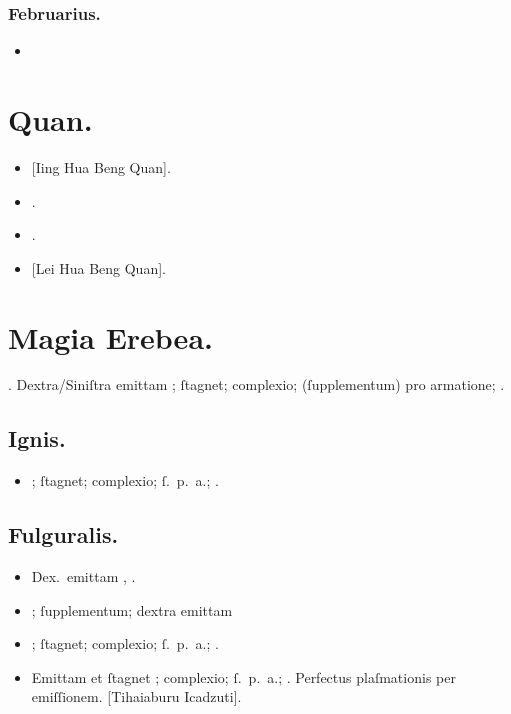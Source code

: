 \documentclass[12pt]{book}
\begin{document}
\subsection{Februarius.}\label{februarius}

\begin{itemize}
  \item {}
\end{itemize}


\chapter{Quan.}\label{quan}

\begin{itemize}
  \item {} [Iing Hua Beng Quan].
  \item {} .
  \item {} .
  \item {} [Lei Hua Beng Quan].
\end{itemize}

\chapter{Magia Erebea.}\label{magia-erebea}
.
\noindent
Dextra/Siniſtra emittam ; ſtagnet; complexio; (ſupplementum) pro armatione; .

\section{Ignis.}\label{erebea-ignis}

\begin{itemize}
  \item \textelp{} ; ſtagnet; complexio; ſ.~p.~a.; .
\end{itemize}

\section{Fulguralis.}\label{erebea-fulguralis}

\begin{itemize}
  \item Dex.\ emittam , .
  \item \textelp{} ; ſupplementum; dextra emittam \textelp{}
  \item \textelp{} ; ſtagnet; complexio; ſ.~p.~a.; .
  \item Emittam et ſtagnet ; complexio; ſ.~p.~a.;
        .
        Perfectus plaſmationis per emiſſionem.
        [Tihaiaburu Icadzuti].
\end{itemize}
\end{document}
